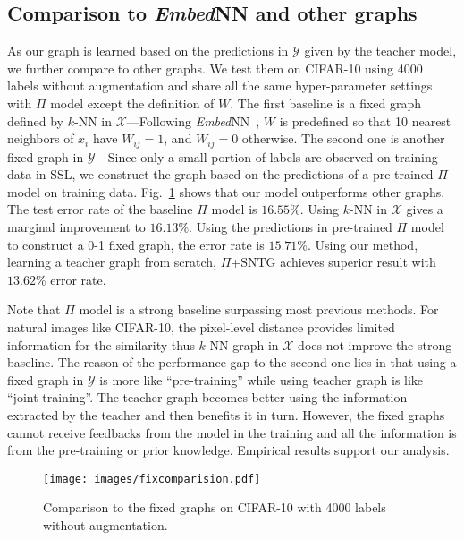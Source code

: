 \documentclass[10pt,twocolumn,letterpaper]{article}
\begin{document}
\subsection{Comparison to \emph{Embed}NN and other graphs}
\label{sec:fixgraph}


As our graph is learned based on the predictions in $\mathcal{Y}$ given by the teacher model, we further compare to other graphs. We test them on CIFAR-10 using 4000 labels without augmentation and share all the same hyper-parameter settings with $\Pi$ model except the definition of $W$.
The first baseline is a fixed graph defined by $k$-NN in $\mathcal{X}$---Following \emph{Embed}NN~\cite{weston2008deep}, $W$ is predefined so that 10 nearest neighbors of $x_i$ have $W_{ij}=1$, and $W_{ij}=0$ otherwise.
The second one is another fixed graph in $\mathcal{Y}$---Since only a small portion of labels are observed on training data in SSL, we construct the graph based on the predictions of a pre-trained $\Pi$ model on training data.
Fig.~\ref{fig:fixed} shows that our model outperforms other graphs. The test error rate of the baseline $\Pi$ model is $16.55\%$. Using $k$-NN in $\mathcal{X}$ gives a marginal improvement to $16.13\%$.
Using the predictions in pre-trained $\Pi$ model to construct a 0-1 fixed graph, the error rate is $15.71\%$. Using our method, learning a teacher graph from scratch, $\Pi$+SNTG achieves superior result with $13.62\%$ error rate.


Note that $\Pi$ model is a strong baseline surpassing most previous methods. For natural images like CIFAR-10, the pixel-level distance provides limited information for the similarity thus $k$-NN graph in $\mathcal{X}$ does not improve the strong baseline. The reason of the performance gap to the second one lies in that using a fixed graph in $\mathcal{Y}$ is more like ``pre-training'' while using teacher graph is like ``joint-training''. The teacher graph becomes better using the information extracted by the teacher and then benefits it in turn. However, the fixed graphs cannot receive feedbacks from the model in the training and all the information is from the pre-training or prior knowledge. Empirical results support our analysis.

\begin{figure}[h]\vspace{-.4cm}
	\centering
	\texttt{[image: images/fixcomparision.pdf]}\vspace{-.3cm}
	\caption{Comparison to the fixed graphs on CIFAR-10 with 4000 labels without augmentation.
	}\vspace{-.4cm}
	\label{fig:fixed}
\end{figure}
\end{document}
